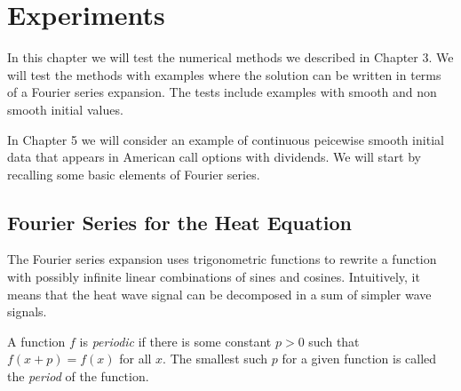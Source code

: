 \documentclass[00main.tex]{subfiles}
\begin{document}

\chapter{Experiments}


In this chapter we will test the numerical methods we described in Chapter 3. We will test the methods with examples where the solution can be written in terms of a Fourier series expansion. The tests include examples with smooth and non smooth initial values.

In Chapter 5 we will consider an example of continuous peicewise smooth initial data that appears in American call options with dividends. We will start by recalling some basic elements of Fourier series.


\section{Fourier Series for the Heat Equation}


The Fourier series expansion uses trigonometric functions to rewrite a function with possibly infinite linear combinations of sines and cosines. Intuitively, it means that the heat wave signal can be decomposed in a sum of simpler wave signals.

\begin{defi}
A function $f$ is \emph{periodic} if there is some constant $p>0$ such that $f(x+p) = f(x)$ for all $x$. The smallest such $p$ for a given function is called the \emph{period} of the function.
\end{defi}
\end{document}
